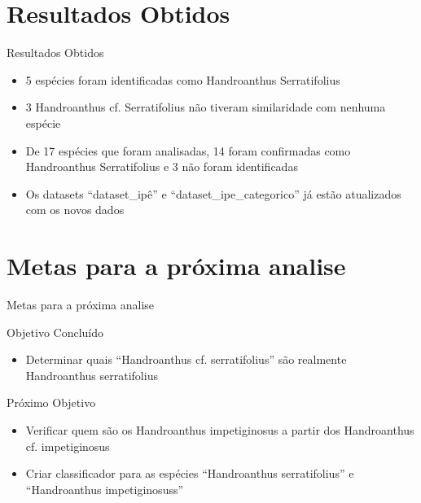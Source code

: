 \documentclass[10pt,aspectratio=169]{beamer}
\theoremstyle{remark}
\theoremstyle{definition}
\begin{document}
\section{Resultados Obtidos}
\begin{frame}[fragile]{Resultados Obtidos}
\begin{itemize}
    \item 5 espécies foram identificadas como Handroanthus Serratifolius
    \item 3 Handroanthus cf. Serratifolius não tiveram similaridade com nenhuma espécie
    \item De 17 espécies que foram analisadas, 14 foram confirmadas como Handroanthus Serratifolius e 3 não foram identificadas 
    \item Os datasets ``dataset\_ipê'' e ``dataset\_ipe\_categorico'' já estão atualizados com os novos dados
\end{itemize}
\end{frame}


\section{Metas para a próxima analise}
\begin{frame}[fragile]{Metas para a próxima analise}
\begin{block}{Objetivo Concluído}
\begin{itemize}
    \item Determinar quais “Handroanthus cf. serratifolius” são realmente Handroanthus serratifolius
\end{itemize}
\end{block}

\begin{alertblock}{Próximo Objetivo}
\begin{itemize}
    \item Verificar quem são os Handroanthus impetiginosus a partir dos Handroanthus cf. impetiginosus
    \item Criar classificador para as espécies ``Handroanthus serratifolius'' e ``Handroanthus impetiginosuss''
\end{itemize}
\end{alertblock}



\end{frame}
\end{document}
